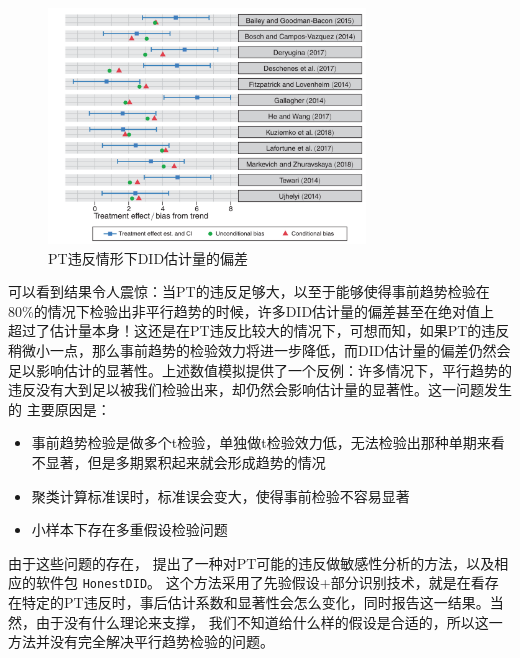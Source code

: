 \documentclass[../didNotes.tex]{subfiles}
\begin{document}
\begin{figure}[htbp]
  \begin{center}
    \includegraphics[width=0.75\textwidth]{./assets/PT_caution.png}
  \end{center}
  \caption{PT违反情形下DID估计量的偏差}
  \label{pic:PT_bias}
\end{figure}

可以看到结果令人震惊：当PT的违反足够大，以至于能够使得事前趋势检验在80\%的情况下检验出非平行趋势的时候，许多DID估计量的偏差甚至在绝对值上
超过了估计量本身！这还是在PT违反比较大的情况下，可想而知，如果PT的违反稍微小一点，那么事前趋势的检验效力将进一步降低，而DID估计量的偏差仍然会
足以影响估计的显著性。上述数值模拟提供了一个反例：许多情况下，平行趋势的违反没有大到足以被我们检验出来，却仍然会影响估计量的显著性。这一问题发生的
主要原因是：
\begin{itemize}
  \item 事前趋势检验是做多个t检验，单独做t检验效力低，无法检验出那种单期来看不显著，但是多期累积起来就会形成趋势的情况
  \item 聚类计算标准误时，标准误会变大，使得事前检验不容易显著
  \item 小样本下存在多重假设检验问题
\end{itemize}

由于这些问题的存在，\textcite{rambachan2023} 提出了一种对PT可能的违反做敏感性分析的方法，以及相应的软件包 \texttt{HonestDID}。
这个方法采用了先验假设+部分识别技术，就是在看存在特定的PT违反时，事后估计系数和显著性会怎么变化，同时报告这一结果。当然，由于没有什么理论来支撑，
我们不知道给什么样的假设是合适的，所以这一方法并没有完全解决平行趋势检验的问题。
\end{document}
